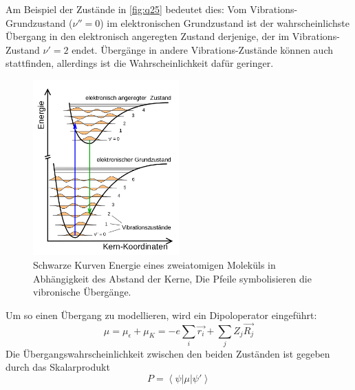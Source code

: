 Am Beispiel der Zustände in \autoref{fig:q25} bedeutet dies: Vom Vibrations-Grundzustand ($\nu'' = 0$) im elektronischen Grundzustand ist der wahrscheinlichste Übergang in den elektronisch angeregten Zustand derjenige, der im Vibrations-Zustand $\nu' = 2$ endet. Übergänge in andere Vibrations-Zustände können auch stattfinden, allerdings ist die Wahrscheinlichkeit dafür geringer.


\begin{figure}[H]
    \centering
    \includegraphics[width = 0.5\textwidth]{resources/09-05-2012/Franck-Condon-Prinzip}
    \caption{Schwarze Kurven Energie eines zweiatomigen Moleküls in Abhängigkeit des Abstand der Kerne, Die Pfeile symbolisieren die vibronische Übergänge.}
    \label{fig:q25}
\end{figure}


Um so einen Übergang zu modellieren, wird ein Dipoloperator eingeführt:
\begin{equation}
    \mu = \mu_{\epsilon} + \mu_K = - e \sum_{i} \vec{r_i}  + \sum_{j} Z_j \vec{R_j} 
\end{equation}
Die Übergangswahrscheinlichkeit zwischen den beiden Zuständen ist gegeben durch das Skalarprodukt
\begin{equation}
    P = \left\langle\psi| \mu | \psi' \right\rangle   
\end{equation}

